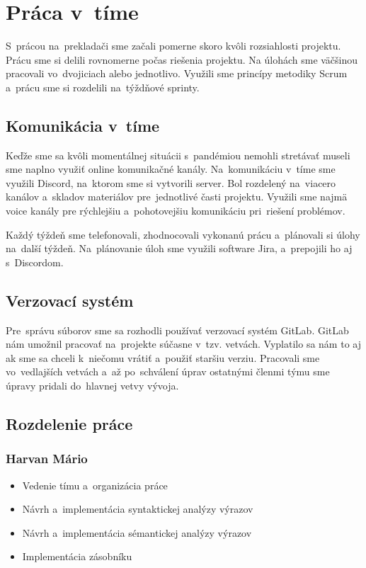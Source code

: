\documentclass[a4paper, 12pt]{article}[25.11.2020]
\begin{document}
\section{Práca v~tíme}
    \par S~prácou na~prekladači sme začali pomerne skoro kvôli rozsiahlosti projektu.
    Prácu sme si delili rovnomerne počas riešenia projektu. Na úlohách sme väčšinou
    pracovali vo~dvojiciach alebo jednotlivo. Využili sme princípy metodiky Scrum 
    a~prácu sme si rozdelili na~týždňové sprinty.
    \subsection{Komunikácia v~tíme}
        \par Keďže sme sa kvôli momentálnej situácii s~pandémiou nemohli stretávať
        museli sme naplno využiť online komunikačné kanály. Na~komunikáciu v~tíme sme
        využili Discord, na~ktorom sme si vytvorili server. Bol rozdelený na~viacero
        kanálov a~skladov materiálov pre~jednotlivé časti projektu. Využili sme najmä
        voice kanály pre rýchlejšiu a~pohotovejšiu komunikáciu pri~riešení problémov.
        \par Každý týždeň sme telefonovali, zhodnocovali vykonanú prácu a~plánovali si
        úlohy na~další týždeň. Na~plánovanie úloh sme využili software Jira, 
        a~prepojili ho aj s~Discordom.
    \subsection{Verzovací systém}
        \par Pre~správu súborov sme sa rozhodli používať verzovací systém GitLab.
        GitLab nám umožnil pracovať na~projekte súčasne v~tzv. vetvách. Vyplatilo sa
        nám to aj ak sme sa chceli k~niečomu vrátiť a~použiť staršiu verziu. Pracovali
        sme vo~vedlajších vetvách a~až po~schválení úprav ostatnými členmi týmu sme
        úpravy pridali do~hlavnej vetvy vývoja.
\newpage
    \subsection{Rozdelenie práce}
        \subsubsection{Harvan Mário}
            \begin{itemize}
                \item Vedenie tímu a~organizácia práce
                \item Návrh a~implementácia syntaktickej analýzy výrazov
                \item Návrh a~implementácia sémantickej analýzy výrazov
                \item Implementácia zásobníku
            \end{itemize}
\end{document}
